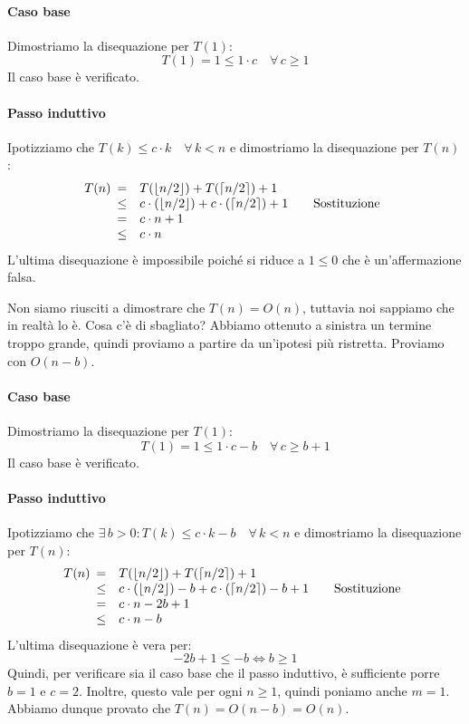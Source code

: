 \begin{eg}
    \paragraph{Caso base} Dimostriamo la disequazione per $T(1)$:
    \[T(1)=1\leq 1\cdot c\quad\forall\,c\geq1\]
    Il caso base è verificato.

    \paragraph{Passo induttivo} Ipotizziamo che $T(k)\leq c\cdot k\quad\forall\,k<n$
    e dimostriamo la disequazione per $T(n)$:
    \[T(n)\begin{array}[t]{cll}
        = & T(\lfloor n/2\rfloor)+T(\lceil n/2\rceil)+1\\
        \leq & c\cdot(\lfloor n/2\rfloor)+c\cdot(\lceil n/2\rceil)+1 & \quad\text{Sostituzione}\\
        = & c\cdot n + 1\\
        \leq & c\cdot n
    \end{array}\]
    L'ultima disequazione è impossibile poiché si riduce a $1\leq 0$ che è
    un'affermazione falsa.

    \bigskip\noindent
    Non siamo riusciti a dimostrare che $T(n)=O(n)$, tuttavia noi sappiamo
    che in realtà lo è. Cosa c'è di sbagliato? Abbiamo ottenuto a sinistra un
    termine troppo grande, quindi proviamo a partire da un'ipotesi più ristretta.
    Proviamo con $O(n-b)$.

    \paragraph{Caso base} Dimostriamo la disequazione per $T(1)$:
    \[T(1)=1\leq 1\cdot c-b\quad\forall\,c\geq b+1\]
    Il caso base è verificato.

    \paragraph{Passo induttivo} Ipotizziamo che $\exists\,b>0:T(k)\leq c\cdot k-b\quad
    \forall\,k<n$ e dimostriamo la disequazione per $T(n)$:
    \[T(n)\begin{array}[t]{cll}
        = & T(\lfloor n/2\rfloor)+T(\lceil n/2\rceil)+1\\
        \leq & c\cdot(\lfloor n/2\rfloor)-b+c\cdot(\lceil n/2\rceil)-b+1 & \quad\text{Sostituzione}\\
        = & c\cdot n-2b+1\\
        \leq & c\cdot n-b
    \end{array}\]
    L'ultima disequazione è vera per:
    \[-2b+1\leq-b\Leftrightarrow b\geq1\]
    Quindi, per verificare sia il caso base che il passo induttivo, è sufficiente
    porre $b=1$ e $c=2$. Inoltre, questo vale per ogni $n\geq1$, quindi poniamo
    anche $m=1$.
    Abbiamo dunque provato che $T(n)=O(n-b)=O(n)$.


\end{eg}
